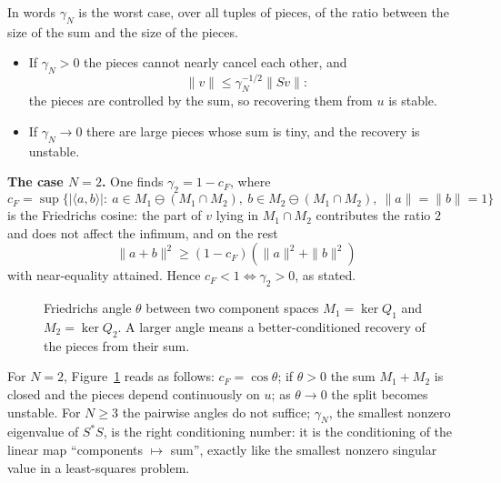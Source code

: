 \begin{aside}{In words}
$\gamma_N$ is the worst case, over all tuples of pieces, of the ratio between the size of the sum and the size of the pieces.
\begin{itemize}[nosep]
\item If $\gamma_N>0$ the pieces cannot nearly cancel each other, and
\[
\|v\|\le\gamma_N^{-1/2}\|Sv\|:
\]
the pieces are controlled by the sum, so recovering them from $u$ is stable.
\item If $\gamma_N\to0$ there are large pieces whose sum is tiny, and the recovery is unstable.
\end{itemize}
\textbf{The case $N=2$.} One finds $\gamma_2=1-c_F$, where
\[
c_F=\sup\{|\langle a,b\rangle|:\ a\in M_1\ominus(M_1\cap M_2),\ b\in M_2\ominus(M_1\cap M_2),\ \|a\|=\|b\|=1\}
\]
is the Friedrichs cosine: the part of $v$ lying in $M_1\cap M_2$ contributes the ratio $2$ and does not affect the infimum, and on the rest
\[
\|a+b\|^2\ge(1-c_F)(\|a\|^2+\|b\|^2)
\]
with near-equality attained. Hence $c_F<1\iff\gamma_2>0$, as stated.
\end{aside}
\begin{figure}[!htb]
\centering
{}
\caption{Friedrichs angle $\theta$ between two component spaces $M_1=\ker Q_1$ and $M_2=\ker Q_2$. A larger angle means a better-conditioned recovery of the pieces from their sum.}\label{xfig:friedrichs}
\end{figure}
For $N=2$, Figure~\ref{xfig:friedrichs} reads as follows: $c_F=\cos\theta$; if $\theta>0$ the sum $M_1+M_2$ is closed and the pieces depend continuously on $u$; as $\theta\to0$ the split becomes unstable. For $N\ge3$ the pairwise angles do not suffice; $\gamma_N$, the smallest nonzero eigenvalue of $S^*S$, is the right conditioning number: it is the conditioning of the linear map ``components $\mapsto$ sum'', exactly like the smallest nonzero singular value in a least-squares problem.

